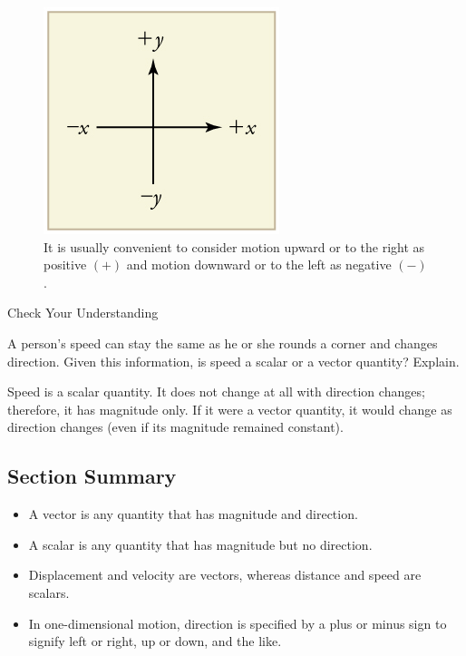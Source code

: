 \documentclass[
]{book}
\providecommand{\tightlist}{%
  \setlength{\itemsep}{0pt}\setlength{\parskip}{0pt}}
\begin{document}
\begin{figure}
\hypertarget{import-auto-id1758074}{%
\centering
\includegraphics{images/Figure_02_02_00b.jpg}
\caption{It is usually convenient to consider motion upward or to the right as
positive \({( + )}{}\) and motion downward or to the left as negative
\({( - )}{}\).}\label{import-auto-id1758074}
}
\end{figure}

\hypertarget{fs-id1788025}{}
Check Your Understanding

\leavevmode{}%
A person's speed can stay the same as he or she rounds a corner and
changes direction. Given this information, is speed a scalar or a vector
quantity? Explain.

\leavevmode{}%
Speed is a scalar quantity. It does not change at all with direction
changes; therefore, it has magnitude only. If it were a vector quantity,
it would change as direction changes (even if its magnitude remained
constant).

\hypertarget{fs-id1784568-summary}{}
\hypertarget{section-summary-1}{%
\subsection{Section Summary}\label{section-summary-1}}

\begin{itemize}
\tightlist
\item
  \protect\hypertarget{import-auto-id1534176}{}{A vector is any quantity that has magnitude and
  direction.}
\item
  \protect\hypertarget{import-auto-id1777731}{}{A scalar is any quantity that has magnitude but no
  direction.}
\item
  \protect\hypertarget{import-auto-id1416292}{}{Displacement and velocity are vectors, whereas distance and speed
  are scalars.}
\item
  \protect\hypertarget{import-auto-id1739033}{}{In one-dimensional motion, direction is specified by a plus or
  minus sign to signify left or right, up or down, and the
  like.}
\end{itemize}
\end{document}
